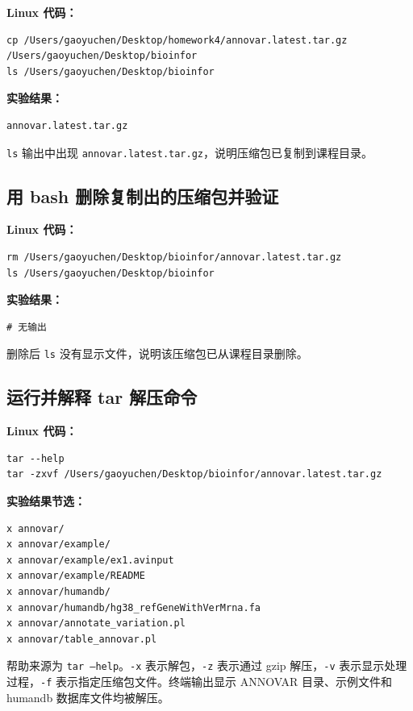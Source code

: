 \documentclass[12pt,a4paper,fontset=fandol]{ctexart}
\begin{document}
\noindent\textbf{Linux 代码：}
\begin{lstlisting}[style=linuxcode]
cp /Users/gaoyuchen/Desktop/homework4/annovar.latest.tar.gz /Users/gaoyuchen/Desktop/bioinfor
ls /Users/gaoyuchen/Desktop/bioinfor
\end{lstlisting}

\noindent\textbf{实验结果：}
\begin{lstlisting}[style=resultcode]
annovar.latest.tar.gz
\end{lstlisting}

\texttt{ls} 输出中出现 \texttt{annovar.latest.tar.gz}，说明压缩包已复制到课程目录。

\subsection{用 bash 删除复制出的压缩包并验证}
\noindent\textbf{Linux 代码：}
\begin{lstlisting}[style=linuxcode]
rm /Users/gaoyuchen/Desktop/bioinfor/annovar.latest.tar.gz
ls /Users/gaoyuchen/Desktop/bioinfor
\end{lstlisting}

\noindent\textbf{实验结果：}
\begin{lstlisting}[style=resultcode]
# 无输出
\end{lstlisting}

删除后 \texttt{ls} 没有显示文件，说明该压缩包已从课程目录删除。

\subsection{运行并解释 tar 解压命令}
\noindent\textbf{Linux 代码：}
\begin{lstlisting}[style=linuxcode]
tar --help
tar -zxvf /Users/gaoyuchen/Desktop/bioinfor/annovar.latest.tar.gz
\end{lstlisting}

\noindent\textbf{实验结果节选：}
\begin{lstlisting}[style=resultcode]
x annovar/
x annovar/example/
x annovar/example/ex1.avinput
x annovar/example/README
x annovar/humandb/
x annovar/humandb/hg38_refGeneWithVerMrna.fa
x annovar/annotate_variation.pl
x annovar/table_annovar.pl
\end{lstlisting}

帮助来源为 \texttt{tar --help}。\texttt{-x} 表示解包，\texttt{-z} 表示通过 gzip 解压，\texttt{-v} 表示显示处理过程，\texttt{-f} 表示指定压缩包文件。终端输出显示 ANNOVAR 目录、示例文件和 humandb 数据库文件均被解压。
\end{document}

